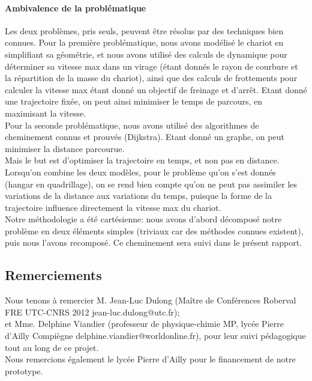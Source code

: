 \paragraph{Ambivalence de la problématique}
Les deux problèmes, pris seuls, peuvent être résolus par des techniques bien connues. Pour la première problématique, nous avons modélisé le chariot en simplifiant sa géométrie, et nous avons utilisé des calculs de dynamique pour déterminer sa vitesse max dans un virage (étant donnés le rayon de courbure et la répartition de la masse du chariot), ainsi que des calculs de frottements pour calculer la vitesse max étant donné un objectif de freinage et d'arrêt. Etant donné une trajectoire fixée, on peut ainsi minimiser le temps de parcours, en maximisant la vitesse.\\
Pour la seconde problématique, nous avons utilisé des algorithmes de cheminement connus et prouvés (Dijkstra). Etant donné un graphe, on peut minimiser la distance parcourue.\\
Mais le but est d'optimiser la trajectoire en temps, et non pas en distance. Lorsqu'on combine les deux modèles, pour le problème qu'on s'est donnés (hangar en quadrillage), on se rend bien compte qu'on ne peut pas assimiler les variations de la distance aux variations du temps, puisque la forme de la trajectoire influence directement la vitesse max du chariot.\\
Notre méthodologie a été cartésienne: nous avons d'abord décomposé notre problème en deux éléments simples (triviaux car des méthodes connues existent), puis nous l'avons recomposé. Ce cheminement sera suivi dans le présent rapport.

\subsection{Remerciements}
Nous tenons à remercier M. Jean-Luc Dulong (Maître de Conférences Roberval FRE UTC-CNRS 2012 jean-luc.dulong@utc.fr);\\
et Mme. Delphine Viandier (professeur de physique-chimie MP, lycée Pierre d'Ailly Compiègne delphine.viandier@worldonline.fr), pour leur suivi pédagogique tout au long de ce projet.\\
Nous remercions également le lycée Pierre d'Ailly pour le financement de notre prototype.\\
